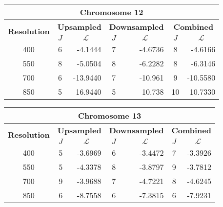\begin{table}[h!]
  \centering
\begin{tabular}{|c|c|r|c|r|c|r|}\hline
\multicolumn{7}{|c|}{\textbf{Chromosome 12}} \\ \hline
\multirow{2}{*}{\textbf{Resolution}} & \multicolumn{2}{|c|}{\textbf{Upsampled}} &  \multicolumn{2}{|c|}{\textbf{Downsampled}} &  \multicolumn{2}{|c|}{\textbf{Combined}} \\ \cline{2-7}
    & $J$ & \multicolumn{1}{|c|}{\textbf{$\mathcal{L}$}} & $J$ & \multicolumn{1}{|c|}{\textbf{$\mathcal{L}$}} &$J$ & \multicolumn{1}{|c|}{\textbf{$\mathcal{L}$}}   \\ \hline
400 & 6 & -4.1444 & 7 & -4.6736 & 8 & -4.6166  \\ \hline
550 & 8 & -5.0504 & 8 & -6.2282 & 8 & -6.3146  \\ \hline
700 & 6 & -13.9440 & 7 & -10.961 & 9 & -10.5580 \\ \hline
850 & 5 & -16.9440 & 5 & -10.738 & 10 & -10.7330  \\ \hline
\end{tabular}
\end{table}

\begin{table}[h!]
  \centering
\begin{tabular}{|c|c|r|c|r|c|r|}\hline
\multicolumn{7}{|c|}{\textbf{Chromosome 13}} \\ \hline
\multirow{2}{*}{\textbf{Resolution}} & \multicolumn{2}{|c|}{\textbf{Upsampled}} &  \multicolumn{2}{|c|}{\textbf{Downsampled}} &  \multicolumn{2}{|c|}{\textbf{Combined}} \\ \cline{2-7}
    & $J$ & \multicolumn{1}{|c|}{\textbf{$\mathcal{L}$}} & $J$ & \multicolumn{1}{|c|}{\textbf{$\mathcal{L}$}} &$J$ & \multicolumn{1}{|c|}{\textbf{$\mathcal{L}$}}   \\ \hline
400 & 5 & -3.6969 & 6 & -3.4472 & 7 & -3.3926  \\ \hline
550 & 5 & -4.3378 & 8 & -3.8797 & 9 & -3.7812  \\ \hline
700 & 9 & -3.9688 & 7 & -4.7221 & 8 & -4.6245  \\ \hline
850 & 6 & -8.7558 & 6 & -7.3815 & 6 & -7.9231  \\ \hline
\end{tabular}
\end{table}

\clearpage

